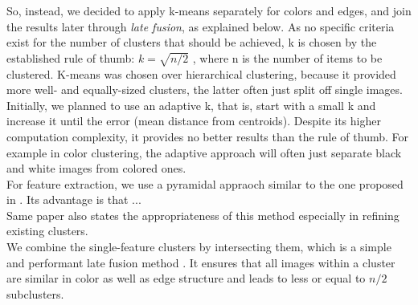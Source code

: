 So, instead, we decided to apply k-means separately for colors and edges, and join the results later through \emph{late fusion}, as explained below. As no specific criteria exist for the number of clusters that should be achieved, k is chosen by the established rule of thumb: $ k = \sqrt{n/2} $ \cite[p.365]{mardia1979}, where n is the number of items to be clustered. K-means was chosen over hierarchical clustering, because it provided more well- and equally-sized clusters, the latter often just split off single images.\\
Initially, we planned to use an adaptive k, that is, start with a small k and increase it until the error (mean distance from centroids). Despite its higher computation complexity, it provides no better results than the rule of thumb. For example in color clustering, the adaptive approach will often just separate black and white images from colored ones.\\
For feature extraction, we use a pyramidal appraoch similar to the one proposed in \cite{Lazebnik2006}. Its advantage is that ... \\
Same paper also states the appropriateness of this method especially in refining existing clusters.\\
We combine the single-feature clusters by intersecting them, which is a simple and performant late fusion method . It ensures that all images within a cluster are similar in color as well as edge structure and leads to less or equal to $ n/2 $ subclusters.
